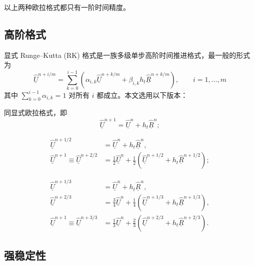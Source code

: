 以上两种欧拉格式都只有一阶时间精度。

\subsection{高阶格式}

显式 Runge–Kutta (RK) 格式是一族多级单步高阶时间推进格式，最一般的形式为
\begin{equation}
\underline{\hat{U}}^{n+i/m}=\sum_{k=0}^{i-1}\left(\alpha_{i,k}\underline{\hat{U}}^{n+k/m}+\beta_{i,k}h_{t}\underline{\hat{R}}^{n+k/m}\right),\qquad i=1,\dots,m\label{eq:RKm}
\end{equation}
其中 $\sum_{k=0}^{i-1}\alpha_{i,k}=1$ 对所有 $i$ 都成立。本文选用以下版本：
\begin{description}[wide]
\item [{一阶}] 同显式欧拉格式，即
\begin{equation}
\underline{\hat{U}}^{n+1}=\underline{\hat{U}}^{n}+h_{t}\underline{\hat{R}}^{n};\label{eq:RK1}
\end{equation}
\item [{二阶}] 
\begin{equation}
\begin{aligned}\underline{\hat{U}}^{n+1/2} & =\underline{\hat{U}}^{n}+h_{t}\underline{\hat{R}}^{n},\\
\underline{\hat{U}}^{n+1}\equiv\underline{\hat{U}}^{n+2/2} & =\frac{1}{2}\underline{\hat{U}}^{n}+\frac{1}{2}\left(\underline{\hat{U}}^{n+1/2}+h_{t}\underline{\hat{R}}^{n+1/2}\right);
\end{aligned}
\label{eq:RK2}
\end{equation}
\item [{三阶}] 
\begin{equation}
\begin{aligned}\underline{\hat{U}}^{n+1/3} & =\underline{\hat{U}}^{n}+h_{t}\underline{\hat{R}}^{n},\\
\underline{\hat{U}}^{n+2/3} & =\frac{3}{4}\underline{\hat{U}}^{n}+\frac{1}{4}\left(\underline{\hat{U}}^{n+1/3}+h_{t}\underline{\hat{R}}^{n+1/3}\right),\\
\underline{\hat{U}}^{n+1}\equiv\underline{\hat{U}}^{n+3/3} & =\frac{1}{3}\underline{\hat{U}}^{n}+\frac{2}{3}\left(\underline{\hat{U}}^{n+2/3}+h_{t}\underline{\hat{R}}^{n+2/3}\right).
\end{aligned}
\label{eq:RK3}
\end{equation}
\end{description}
%

\subsection{强稳定性}

